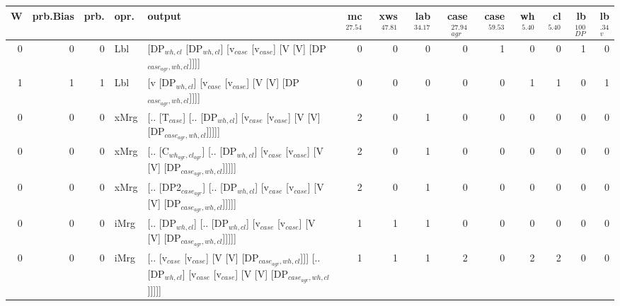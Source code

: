 \begin{tabularx}{\linewidth}{rrrlXrrrrrrrrr}
\hline
   W &   prb.Bias &   prb. & opr.   & output                                                                                                           &   mc$^{27.54}$ &   xws$^{47.81}$ &   lab$^{34.17}$ &   case$_{agr}^{27.94}$ &   case$^{59.53}$ &   wh$^{5.40}$ &   cl$^{5.40}$ &   lb$_{DP}^{100}$ &   lb$_{v}^{.34}$ \\
\hline
   0 &       0 &   0 & Lbl  & [DP$_{wh,cl}$ [DP$_{wh,cl}$] [v$_{case}$ [v$_{case}$] [V [V] [DP$_{case_{agr},wh,cl}$]]]]                                              &            0 &             0 &             0 &                  0 &              1 &           0 &           0 &                1 &             0 \\
   1 &       1 &   1 & Lbl  & [v [DP$_{wh,cl}$] [v$_{case}$ [v$_{case}$] [V [V] [DP$_{case_{agr},wh,cl}$]]]]                                                     &            0 &             0 &             0 &                  0 &              0 &           1 &           1 &                0 &             1 \\
   0 &       0 &   0 & xMrg & [.. [T$_{case}$] [.. [DP$_{wh,cl}$] [v$_{case}$ [v$_{case}$] [V [V] [DP$_{case_{agr},wh,cl}$]]]]]                                      &            2 &             0 &             1 &                  0 &              0 &           0 &           0 &                0 &             0 \\
   0 &       0 &   0 & xMrg & [.. [C$_{wh_{agr},cl_{agr}}$] [.. [DP$_{wh,cl}$] [v$_{case}$ [v$_{case}$] [V [V] [DP$_{case_{agr},wh,cl}$]]]]]                             &            2 &             0 &             1 &                  0 &              0 &           0 &           0 &                0 &             0 \\
   0 &       0 &   0 & xMrg & [.. [DP2$_{case_{agr}}$] [.. [DP$_{wh,cl}$] [v$_{case}$ [v$_{case}$] [V [V] [DP$_{case_{agr},wh,cl}$]]]]]                                &            2 &             0 &             1 &                  0 &              0 &           0 &           0 &                0 &             0 \\
   0 &       0 &   0 & iMrg & [.. [DP$_{wh,cl}$] [.. [DP$_{wh,cl}$] [v$_{case}$ [v$_{case}$] [V [V] [DP$_{case_{agr},wh,cl}$]]]]]                                    &            1 &             1 &             1 &                  0 &              0 &           0 &           0 &                0 &             0 \\
   0 &       0 &   0 & iMrg & [.. [v$_{case}$ [v$_{case}$] [V [V] [DP$_{case_{agr},wh,cl}$]]] [.. [DP$_{wh,cl}$] [v$_{case}$ [v$_{case}$] [V [V] [DP$_{case_{agr},wh,cl}$]]]]] &            1 &             1 &             1 &                  2 &              0 &           2 &           2 &                0 &             0 \\

\end{tabularx}
